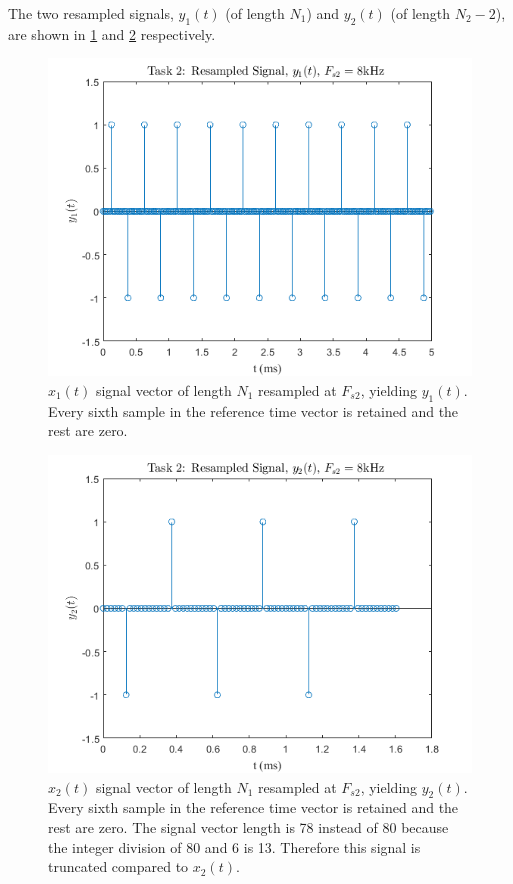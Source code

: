 \documentclass[a4paper,12pt]{article}
\begin{document}
The two resampled signals, $y_1(t)$ (of length $N_1$) and $y_2(t)$ (of length $N_2-2$), are shown in \cref{T2a} and \cref{T2b} respectively.

\begin{figure}[!h]
    \centering
    \includegraphics[width=1\textwidth]{T2a.png}
    \captionsetup{justification=centering}
    \caption{\small $x_1(t)$ signal vector of length $N_1$ resampled at $F_{s2}$, yielding $y_1(t)$. Every sixth sample in the reference time vector is retained and the rest are zero.}
    \label{T2a}
\end{figure}

\begin{figure}[!t]
    \centering
    \includegraphics[width=1\textwidth]{T2b.png}
    \captionsetup{justification=centering}
    \caption{\small $x_2(t)$ signal vector of length $N_1$ resampled at $F_{s2}$, yielding $y_2(t)$. Every sixth sample in the reference time vector is retained and the rest are zero. The signal vector length is 78 instead of 80 because the integer division of 80 and 6 is 13. Therefore this signal is truncated compared to $x_2(t)$.}
    \label{T2b}
\end{figure}
\end{document}
